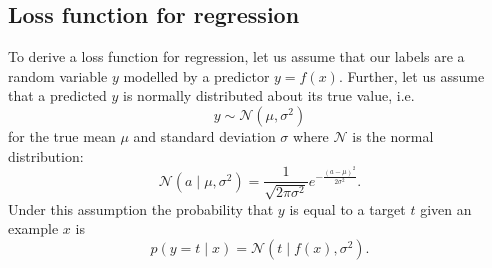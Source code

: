         \subsection{Loss function for regression}
        \label{sec:loss-regression}

            To derive a loss function for regression, let us assume that our labels are a random variable $y$ modelled by a predictor $y = f(x)$. Further, let us assume that a predicted $y$ is normally distributed about its true value, i.e.
            \begin{equation}
                y \sim \mathcal N(\mu, \sigma^2)
            \end{equation}
            for the true mean $\mu$ and standard deviation $\sigma$ where $\mathcal N$ is the normal distribution:
            \begin{equation}
                \mathcal N(a \mid \mu, \sigma^2) = \frac{1}{\sqrt{2\pi\sigma^2}} e^{-\frac{(a - \mu)^2}{2\sigma^2}}.
            \end{equation}
            Under this assumption the probability that $y$ is equal to a target $t$ given an example $x$ is
            \begin{equation}
                p(y = t \mid x) = \mathcal N(t \mid f(x), \sigma^2).
            \end{equation}

